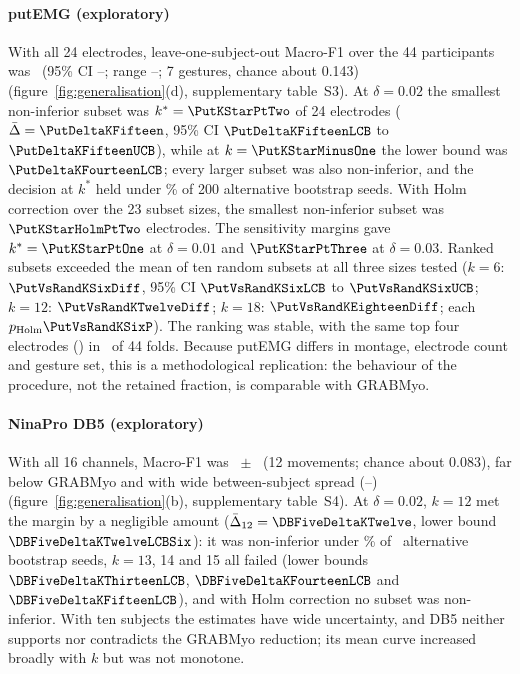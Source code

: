 \paragraph{putEMG (exploratory)} With all 24 electrodes, leave-one-subject-out Macro-F1 over the 44 participants was \PutFull\ (95\% CI \PutFullLCB--\PutFullUCB; range \PutFullMin--\PutFullMax; 7 gestures, chance about 0.143) (figure~\ref{fig:generalisation}(d), supplementary table~S3). At $\delta = 0.02$ the smallest non-inferior subset was $k^* = \PutKStarPtTwo$ of 24 electrodes ($\bar\Delta = \PutDeltaKFifteen$, 95\% CI $\PutDeltaKFifteenLCB$ to $\PutDeltaKFifteenUCB$), while at $k = \PutKStarMinusOne$ the lower bound was $\PutDeltaKFourteenLCB$; every larger subset was also non-inferior, and the decision at $k^*$ held under \PutSeedFrac\% of 200 alternative bootstrap seeds. With Holm correction over the 23 subset sizes, the smallest non-inferior subset was $\PutKStarHolmPtTwo$ electrodes. The sensitivity margins gave $k^* = \PutKStarPtOne$ at $\delta = 0.01$ and $\PutKStarPtThree$ at $\delta = 0.03$. Ranked subsets exceeded the mean of ten random subsets at all three sizes tested ($k = 6$: $\PutVsRandKSixDiff$, 95\% CI $\PutVsRandKSixLCB$ to $\PutVsRandKSixUCB$; $k = 12$: $\PutVsRandKTwelveDiff$; $k = 18$: $\PutVsRandKEighteenDiff$; each $p_{\mathrm{Holm}} \PutVsRandKSixP$). The ranking was stable, with the same top four electrodes (\PutTopFourSet) in \PutTopFourFolds\ of 44 folds. Because putEMG differs in montage, electrode count and gesture set, this is a methodological replication: the behaviour of the procedure, not the retained fraction, is comparable with GRABMyo.

\paragraph{NinaPro DB5 (exploratory)} With all 16 channels, Macro-F1 was \DBFiveFull\ $\pm$ \DBFiveFullSD\ (12 movements; chance about 0.083), far below GRABMyo and with wide between-subject spread (\DBFiveFullMin--\DBFiveFullMax) (figure~\ref{fig:generalisation}(b), supplementary table~S4). At $\delta = 0.02$, $k = 12$ met the margin by a negligible amount ($\bar\Delta_{12} = \DBFiveDeltaKTwelve$, lower bound $\DBFiveDeltaKTwelveLCBSix$): it was non-inferior under \DBFiveSeedFrac\% of \DBFiveSeedN\ alternative bootstrap seeds, $k = 13$, 14 and 15 all failed (lower bounds $\DBFiveDeltaKThirteenLCB$, $\DBFiveDeltaKFourteenLCB$ and $\DBFiveDeltaKFifteenLCB$), and with Holm correction no subset was non-inferior. With ten subjects the estimates have wide uncertainty, and DB5 neither supports nor contradicts the GRABMyo reduction; its mean curve increased broadly with $k$ but was not monotone.

